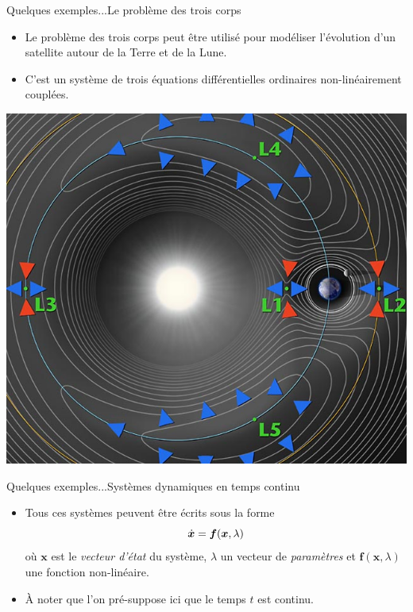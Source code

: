 \documentclass[usenames,dvipsnames,svgnames,10pt,aspectratio=169]{beamer}
\begin{document}
\begin{frame}[t, c]{Quelques exemples...}{Le problème des trois corps}
	\begin{minipage}{.48\textwidth}
		\begin{itemize}
			\item Le problème des trois corps peut être utilisé pour modéliser l'évolution d'un satellite autour de la Terre et de la Lune.
			\bigskip
			\item C'est un système de trois équations différentielles ordinaires non-linéairement couplées.
		\end{itemize}
	\end{minipage}%
	\hfill
	\begin{minipage}{.48\textwidth}
		\centering
		\includegraphics[width=.8\textwidth]{trois_corps}
	\end{minipage}
	\vspace{1cm}
\end{frame}

\begin{frame}[t, c]{Quelques exemples...}{Systèmes dynamiques en temps continu}

	\begin{itemize}
		\item Tous ces systèmes peuvent être écrits sous la forme
		\begin{equation}
			\dot{\bm x} = \bm{f}({\bm x}, \lambda)
			\notag
		\end{equation}
		où ${\bm x}$ est le \emph{vecteur d'état} du système, $\lambda$ un vecteur de \emph{paramètres} et $\bm{f}({\bm x}, \lambda)$ une fonction non-linéaire.

		\bigskip

		\item \`A noter que l'on pré-suppose ici que le temps $t$ est continu.
	\end{itemize}

	\vspace{1cm}
\end{frame}
\end{document}
